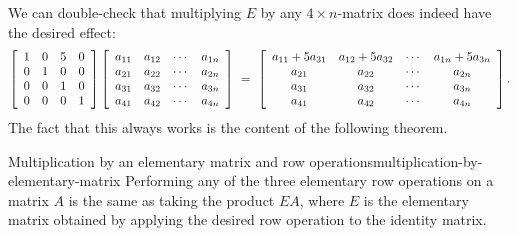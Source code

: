 \documentclass{ximera}
\begin{document}
We can double-check that multiplying $E$ by any $4\times n$-matrix
does indeed have the desired effect:
\begin{equation*}
  \startmat{rrrr}
    1 & 0 & 5 & 0 \\
    0 & 1 & 0 & 0 \\
    0 & 0 & 1 & 0 \\
    0 & 0 & 0 & 1 \\
  \stopmat
  \startmat{cccc}
    a_{11} & a_{12} & \cdots & a_{1n} \\
    a_{21} & a_{22} & \cdots & a_{2n} \\
    a_{31} & a_{32} & \cdots & a_{3n} \\
    a_{41} & a_{42} & \cdots & a_{4n} \\
  \stopmat
  ~=~
  \startmat{cccc}
    a_{11}+5a_{31} & a_{12}+5a_{32} & \cdots & a_{1n}+5a_{3n} \\
    a_{21} & a_{22} & \cdots & a_{2n} \\
    a_{31} & a_{32} & \cdots & a_{3n} \\
    a_{41} & a_{42} & \cdots & a_{4n} \\
  \stopmat.
\end{equation*}
The fact that this always works is the content of the following
theorem.

\begin{theorem}{Multiplication by an elementary matrix and row operations}{multiplication-by-elementary-matrix}
  Performing any of the three elementary row operations on a matrix $A$ is the
  same as taking the product $EA$, where $E$ is the elementary matrix
  obtained by applying the desired row operation to the identity
  matrix.
\end{theorem}
\end{document}
